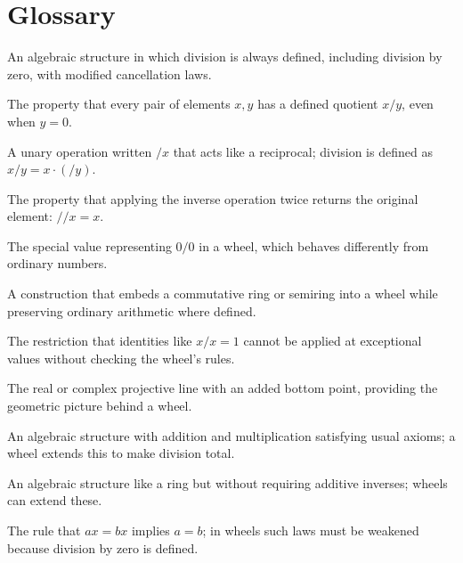 \section*{Glossary}
\begin{description}[leftmargin=*,style=nextline,itemsep=0.3em]
\item[\textbf{Wheel.}] An algebraic structure in which division is always defined, including division by zero, with modified cancellation laws.
\item[\textbf{Total division.}] The property that every pair of elements $x, y$ has a defined quotient $x/y$, even when $y = 0$.
\item[\textbf{Inverse operation.}] A unary operation written $/x$ that acts like a reciprocal; division is defined as $x/y = x \cdot (/y)$.
\item[\textbf{Involution.}] The property that applying the inverse operation twice returns the original element: $//x = x$.
\item[\textbf{Bottom element.}] The special value representing $0/0$ in a wheel, which behaves differently from ordinary numbers.
\item[\textbf{Extension principle.}] A construction that embeds a commutative ring or semiring into a wheel while preserving ordinary arithmetic where defined.
\item[\textbf{Modified cancellation.}] The restriction that identities like $x/x = 1$ cannot be applied at exceptional values without checking the wheel's rules.
\item[\textbf{Projective line.}] The real or complex projective line with an added bottom point, providing the geometric picture behind a wheel.
\item[\textbf{Commutative ring.}] An algebraic structure with addition and multiplication satisfying usual axioms; a wheel extends this to make division total.
\item[\textbf{Semiring.}] An algebraic structure like a ring but without requiring additive inverses; wheels can extend these.
\item[\textbf{Cancellation law.}] The rule that $ax=bx$ implies $a=b$; in wheels such laws must be weakened because division by zero is defined.
\end{description}
